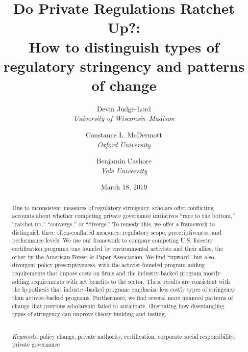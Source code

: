 \documentclass[
      12pt,
        ]{article}
\title{Do Private Regulations Ratchet Up?: 
           \\ How to distinguish types of regulatory stringency and patterns of change%
           }
\author{ %
            Devin Judge-Lord  \\ \emph{University of Wisconsin--Madison} 
             \and 
            Constance L. McDermott  \\ \emph{Oxford University} 
             \and 
            Benjamin Cashore  \\ \emph{Yale University} 
            }
\date{March 18, 2019}
\begin{document}
 


  \maketitle




  \begin{abstract}
    \noindent Due to inconsistent measures of regulatory stringency, scholars offer
conflicting accounts about whether competing private governance
initiatives ``race to the bottom,'' ``ratchet up,'' ``converge,'' or
``diverge.'' To remedy this, we offer a framework to distinguish three
often-conflated measures: regulatory scope, prescriptiveness, and
performance levels. We use our framework to compare competing U.S.
forestry certification programs, one founded by environmental activists
and their allies, the other by the American Forest \& Paper Association.
We find ``upward'' but also divergent policy prescriptiveness, with the
activist-founded program adding requirements that impose costs on firms
and the industry-backed program mostly adding requirements with net
benefits to the sector. These results are consistent with the hypothesis
that industry-backed programs emphasize less costly types of stringency
than activist-backed programs. Furthermore, we find several more nuanced
patterns of change that previous scholarship failed to anticipate,
illustrating how disentangling types of stringency can improve theory
building and testing. 

          \hfill \\ 
      \noindent \emph{Keywords}: policy change, private authority, certification, corporate social
responsibility, private governance 
    
  \end{abstract}










\noindent 
      \doublespacing 
    
\newpage
\singlespacing 
\end{document}
